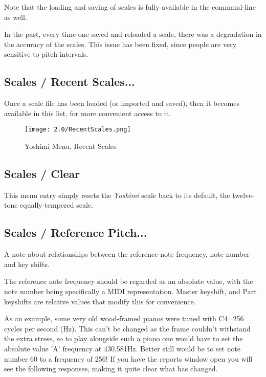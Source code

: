    Note that the loading and saving of scales is fully available in the
   command-line as well.

   In the past, every time one saved and reloaded a scale, there was a
   degradation in the accuracy of the scales.  This issue has been fixed, since
   people are very sensitive to pitch intervals.

\subsection{Scales / Recent Scales...}
\label{subsec:scales_recent_scales}

   Once a scale file has been loaded (or imported and saved), then it
   becomes available in this list, for more convenient access to it.

\begin{figure}[H]
   \centering
   \texttt{[image: 2.0/RecentScales.png]}
   \caption{Yoshimi Menu, Recent Scales}
   \label{fig:yoshimi_recent_scales}
\end{figure}

\subsection{Scales / Clear}
\label{subsec:scales_clear}

   This menu entry simply resets the \textsl{Yoshimi} scale back to its default,
   the twelve-tone equally-tempered scale.

\subsection{Scales / Reference Pitch...}
\label{subsec:scales_reference_pitch}
   A note about relationships between the reference note frequency, note number
   and key shifts.

   The reference note frequency should be regarded as an absolute value, with the
   note number being specifically a MIDI representation.
   Master keyshift, and Part keyshifts are relative values that modify this for
   convenience.

   As an example, some very old wood-framed pianos were tuned with C4=256 cycles
   per second (Hz). This can't be changed as the frame couldn't withstand the
   extra stress, so to play alongside such a piano one would have to set the
   absolute value 'A' frequency at 430.581Hz. Better still would be to set note
   number 60 to a frequency of 256! If you have the reports window open you will see the following responses, making it quite clear what has changed.

